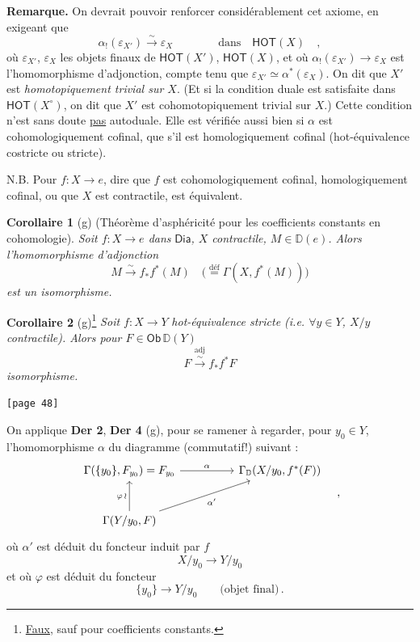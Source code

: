 \documentclass[11pt]{article}
\newcommand{\msp}[1]{\marginpar{\footnotesize [#1]}}
\newcommand{\D}{\mathbb{D}}
\newcommand{\Dia}{\mathsf{Dia}}
\newcommand{\HOT}{\mathsf{HOT}}
\newcommand{\Ob}{\mathsf{Ob}}
\begin{document}
\noindent\textbf{Remarque.} On devrait pouvoir renforcer considérablement cet axiome, en exigeant que
\[ \alpha_{!}(\varepsilon_{X'}) \xrightarrow{\sim} \varepsilon_{X} \qquad\qquad \text{dans} \quad \HOT(X) \quad , \]
où $\varepsilon_{X'}$, $\varepsilon_{X}$ les objets finaux de $\HOT(X')$, $\HOT(X)$, et où $\alpha_{!}(\varepsilon_{X'}) \to \varepsilon_{X}$ est l'homomorphisme d'adjonction, compte tenu que $\varepsilon_{X'} \simeq \alpha^{*}(\varepsilon_{X})$. On dit que $X'$ est \textit{homotopiquement trivial sur $X$}. (Et si la condition duale est satisfaite dans $\HOT(X^{\circ})$, on dit que $X'$ est cohomotopiquement trivial sur $X$.) Cette condition n'est sans doute \underline{pas} autoduale. Elle est vérifiée aussi bien si $\alpha$ est cohomologiquement cofinal, que s'il est homologiquement cofinal (hot-équivalence costricte ou stricte).

\noindent N.B. Pour $f : X \to e$, dire que $f$ est cohomologiquement cofinal, homologiquement cofinal, ou que $X$ est contractile, est équivalent.

\noindent\textbf{Corollaire 1} (g) (Théorème d'asphéricité pour les coefficients constants en cohomologie). \textit{Soit $f : X \to e$ dans} $\Dia$\textit{, $X$ contractile, $M \in \D(e)$. Alors l'homomorphisme d'adjonction}
\[ M \xrightarrow{\sim} f_{*} f^{*}(M) \quad \bigl(\overset{\text{déf}}{=} \Gamma(X, f^{*}(M))\bigr) \]
\textit{est un isomorphisme.}

\noindent\textbf{Corollaire 2} (g)\footnote[16]{\underline{Faux}, sauf pour coefficients constants.} \textit{Soit $f : X \to Y$} \textit{hot-équivalence stricte (i.e. $\forall y \in Y$, $X/y$ contractile). Alors pour $F \in \Ob\,\D(Y)$}
\[ F \overset{\text{adj}}{\xrightarrow{\sim}} f_{*} f^{*} F \]
 \textit{isomorphisme.}

\noindent\msp{page 48}\texttt{[page 48]}

\noindent On applique \textbf{Der 2}, \textbf{Der 4} (g), pour se ramener à regarder, pour $y_{0} \in Y$, l'homomorphisme $\alpha$ du diagramme (commutatif!) suivant :
\[
\begin{tikzcd}[row sep=large, column sep=huge]
\Gamma(\{y_{0}\}, F_{y_{0}}) = F_{y_{0}} \arrow[r, "\alpha"] & \Gamma_{\D}(X/y_{0}, f^{*}(F)) \\
\Gamma(Y/y_{0}, F) \arrow[u, "\varphi\,\wr"] \arrow[ur, "\alpha'"'] &
\end{tikzcd}
\quad ,
\]
où $\alpha'$ est déduit du foncteur induit par $f$
\[ X/y_{0} \longrightarrow Y/y_{0} \]
et où $\varphi$ est déduit du foncteur
\[ \{y_{0}\} \longrightarrow Y/y_{0} \qquad \text{(objet final)}\,. \]
\end{document}

